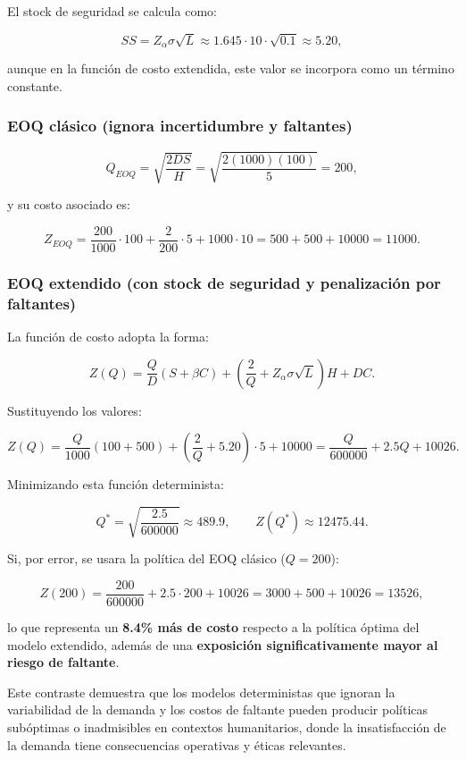 \documentclass[
  spanish,
  us-letterpaper,
  DIV=11,
  numbers=noendperiod]{scrreprt}
\numberwithin{equation}{section}
\begin{document}
El stock de seguridad se calcula como:

\[
SS=Z_{\alpha}\sigma\sqrt{L}\approx1.645\cdot10\cdot\sqrt{0.1}\approx5.20,
\]

aunque en la función de costo extendida, este valor se incorpora como un
término constante.

\subsubsection{EOQ clásico (ignora incertidumbre y
faltantes)}\label{eoq-cluxe1sico-ignora-incertidumbre-y-faltantes}

\[
Q_{EOQ}=\sqrt{\frac{2DS}{H}}=\sqrt{\frac{2(1000)(100)}{5}}=200,
\]

y su costo asociado es:

\[
Z_{EOQ}=\frac{200}{1000}\cdot100+\frac{2}{200}\cdot5+1000\cdot10
=500+500+10000=11000.
\]

\subsubsection{EOQ extendido (con stock de seguridad y penalización por
faltantes)}\label{eoq-extendido-con-stock-de-seguridad-y-penalizaciuxf3n-por-faltantes}

La función de costo adopta la forma:

\[
Z(Q)=\frac{Q}{D}(S+\beta C)+\left(\frac{2}{Q}+Z_{\alpha}\sigma\sqrt{L}\right)H+DC.
\]

Sustituyendo los valores:

\[
Z(Q)=\frac{Q}{1000}(100+500)+\left(\frac{2}{Q}+5.20\right)\cdot5+10000
=\frac{Q}{600000}+2.5Q+10026.
\]

Minimizando esta función determinista:

\[
Q^{\ast}=\sqrt{\frac{2.5}{600000}}\approx489.9,\qquad
Z(Q^{\ast})\approx12475.44.
\]

Si, por error, se usara la política del EOQ clásico (\(Q=200\)):

\[
Z(200)=\frac{200}{600000}+2.5\cdot200+10026
=3000+500+10026=13526,
\]

lo que representa un \textbf{8.4\% más de costo} respecto a la política
óptima del modelo extendido, además de una \textbf{exposición
significativamente mayor al riesgo de faltante}.

Este contraste demuestra que los modelos deterministas que ignoran la
variabilidad de la demanda y los costos de faltante pueden producir
políticas subóptimas o inadmisibles en contextos humanitarios, donde la
insatisfacción de la demanda tiene consecuencias operativas y éticas
relevantes.
\end{document}
